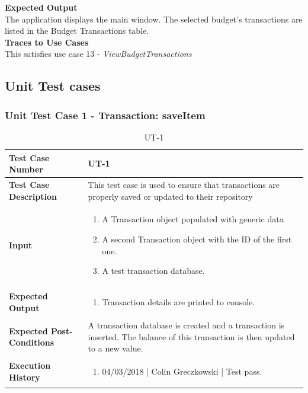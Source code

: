 \documentclass[12pt]{article}
\begin{document}
\noindent
{\bf Expected Output}\\
The application displays the main window. The selected budget's transactions are listed in the Budget Transactions table.\\

\noindent
{\bf Traces to Use Cases}\\
This satisfies use case 13 - \textit{ViewBudgetTransactions}\\
\clearpage

\subsection{Unit Test cases}

\subsubsection{Unit Test Case 1 - Transaction: saveItem}
\def\arraystretch{1.5}%
\begin{table}[htbp]
\centering
\caption {UT-1}
\label{UT-1}
\begin{tabularx}{\textwidth}{ | l | X |}
\hline
\textbf{Test Case Number}      &  UT-1                         \\ \hline
\textbf{Test Case Description}    &  This test case is used to ensure that transactions are properly saved or updated to their repository                \\ \hline
\textbf{Input}         & 	\begin{enumerate}
	\item A Transaction object populated with generic data
          \item A second Transaction object with the ID of the first one.
	\item A test transaction database.
\end{enumerate} \\ \hline

\textbf{Expected Output}     & \begin{enumerate}
	\item Transaction details are printed to console.
\end{enumerate} \\ \hline
\textbf{Expected Post-Conditions}           &  A transaction database is created and a transaction is inserted. The balance of this transaction is then updated to a new value.                   \\ \hline
\textbf{Execution History}   &  \begin{enumerate}
	\item 04/03/2018 | Colin Greczkowski | Test pass.
\end {enumerate} \\ \hline
\end{tabularx}
\end{table}
\clearpage
\end{document}
